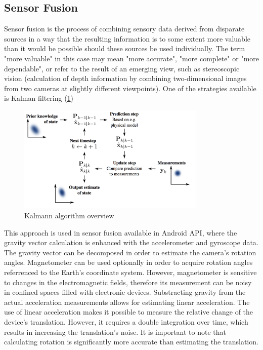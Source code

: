 \subsection{Sensor Fusion\cite{website:sensorFustion}}
Sensor fusion is the process of combining sensory data derived from disparate
sources in a way that the resulting information is to some extent more valuable than it would be possible should these sources be used individually. The term "more valuable" in this case may mean "more
accurate", "more complete" or "more dependable", or refer to the result of an emerging view, such
as stereoscopic vision (calculation of depth information by combining two-dimensional
images from two cameras at slightly different viewpoints). One of the strategies available is Kalman filtering (\ref{fig:Kalmann})
\begin{figure}[p]
    \centering
    \includegraphics[width=0.8\textwidth]{Kalmann}
    \caption{Kalmann algorithm overview}
    \label{fig:Kalmann}
\end{figure}
This approach is used in sensor fusion available in Android API, where the gravity vector calculation is enhanced with the accelerometer and gyroscope data. The gravity vector can be decomposed in order to estimate the camera's rotation angles. Magnetometer can be used optionally in order to acquire rotation angles referrenced to the Earth's coordinate system. However, magnetometer is sensitive to changes in the electromagnetic fields, therefore its measurement can be noisy in confined spaces filled with electronic devices. Substracting gravity from the actual acceleration measurements allows for estimating linear acceleration. The use of linear acceleration makes it possible to measure the relative change of the device's translation. However, it requires a double integration over time, which results in increasing the translation's noise. It is important to note that calculating rotation is significantly more accurate than estimating the translation. 


